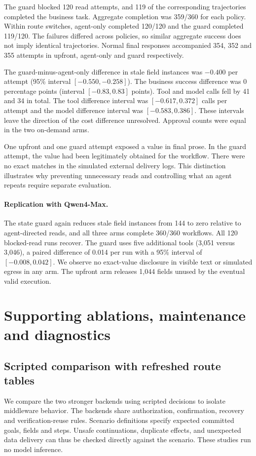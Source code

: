 The guard blocked 120 read attempts, and 119 of the corresponding trajectories completed the business task. Aggregate completion was 359/360 for each policy. Within route switches, agent-only completed 120/120 and the guard completed 119/120. The failures differed across policies, so similar aggregate success does not imply identical trajectories. Normal final responses accompanied 354, 352 and 355 attempts in upfront, agent-only and guard respectively.

The guard-minus-agent-only difference in stale field instances was $-0.400$ per attempt (95\% interval $[-0.550,-0.258]$). The business success difference was 0 percentage points (interval $[-0.83,0.83]$ points). Tool and model calls fell by 41 and 34 in total. The tool difference interval was $[-0.617,0.372]$ calls per attempt and the model difference interval was $[-0.583,0.386]$. These intervals leave the direction of the cost difference unresolved. Approval counts were equal in the two on-demand arms.

One upfront and one guard attempt exposed a value in final prose. In the guard attempt, the value had been legitimately obtained for the workflow. There were no exact matches in the simulated external delivery logs. This distinction illustrates why preventing unnecessary reads and controlling what an agent repeats require separate evaluation.

\paragraph{Replication with Qwen4-Max.}
The state guard again reduces stale field instances from 144 to zero relative to agent-directed reads, and all three arms complete 360/360 workflows. All 120 blocked-read runs recover. The guard uses five additional tools (3,051 versus 3,046), a paired difference of 0.014 per run with a 95\% interval of $[-0.008,0.042]$. We observe no exact-value disclosure in visible text or simulated egress in any arm. The upfront arm releases 1,044 fields unused by the eventual valid execution.

\section{Supporting ablations, maintenance and diagnostics}
\label{sec:supporting-studies}
\subsection{Scripted comparison with refreshed route tables}
\label{sec:scripted}
We compare the two stronger backends using scripted decisions to isolate middleware behavior. The backends share authorization, confirmation, recovery and verification-reuse rules. Scenario definitions specify expected committed goals, fields and steps. Unsafe continuations, duplicate effects, and unexpected data delivery can thus be checked directly against the scenario. These studies run no model inference.

